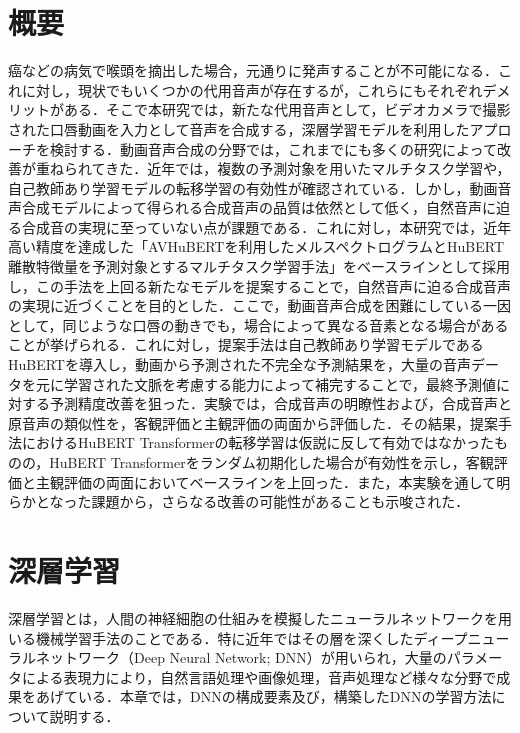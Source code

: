 \documentclass[12pt]{jarticle}
\numberwithin{equation}{section}    %
\numberwithin{figure}{section}      %
\numberwithin{table}{section}      %
\begin{document}
\section*{概要}
\thispagestyle{empty}
癌などの病気で喉頭を摘出した場合，元通りに発声することが不可能になる．これに対し，現状でもいくつかの代用音声が存在するが，これらにもそれぞれデメリットがある．そこで本研究では，新たな代用音声として，ビデオカメラで撮影された口唇動画を入力として音声を合成する，深層学習モデルを利用したアプローチを検討する．動画音声合成の分野では，これまでにも多くの研究によって改善が重ねられてきた．近年では，複数の予測対象を用いたマルチタスク学習や，自己教師あり学習モデルの転移学習の有効性が確認されている．しかし，動画音声合成モデルによって得られる合成音声の品質は依然として低く，自然音声に迫る合成音の実現に至っていない点が課題である．これに対し，本研究では，近年高い精度を達成した「AVHuBERTを利用したメルスペクトログラムとHuBERT離散特徴量を予測対象とするマルチタスク学習手法」をベースラインとして採用し，この手法を上回る新たなモデルを提案することで，自然音声に迫る合成音声の実現に近づくことを目的とした．ここで，動画音声合成を困難にしている一因として，同じような口唇の動きでも，場合によって異なる音素となる場合があることが挙げられる．これに対し，提案手法は自己教師あり学習モデルであるHuBERTを導入し，動画から予測された不完全な予測結果を，大量の音声データを元に学習された文脈を考慮する能力によって補完することで，最終予測値に対する予測精度改善を狙った．実験では，合成音声の明瞭性および，合成音声と原音声の類似性を，客観評価と主観評価の両面から評価した．その結果，提案手法におけるHuBERT Transformerの転移学習は仮説に反して有効ではなかったものの，HuBERT Transformerをランダム初期化した場合が有効性を示し，客観評価と主観評価の両面においてベースラインを上回った．また，本実験を通して明らかとなった課題から，さらなる改善の可能性があることも示唆された．
\clearpage

\setcounter{tocdepth}{2}
\tableofcontents
\thispagestyle{empty}
\clearpage

\pagestyle{plain}
\setcounter{page}{1}


\clearpage


\clearpage

\section{深層学習}
深層学習とは，人間の神経細胞の仕組みを模擬したニューラルネットワークを用いる機械学習手法のことである．特に近年ではその層を深くしたディープニューラルネットワーク（Deep Neural Network; DNN）が用いられ，大量のパラメータによる表現力により，自然言語処理や画像処理，音声処理など様々な分野で成果をあげている．本章では，DNNの構成要素及び，構築したDNNの学習方法について説明する．


\end{document}
